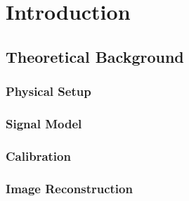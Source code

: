 \chapter{Introduction}
\section{Theoretical Background}
\subsection{Physical Setup}
\subsection{Signal Model}
\subsection{Calibration}
\subsection{Image Reconstruction}